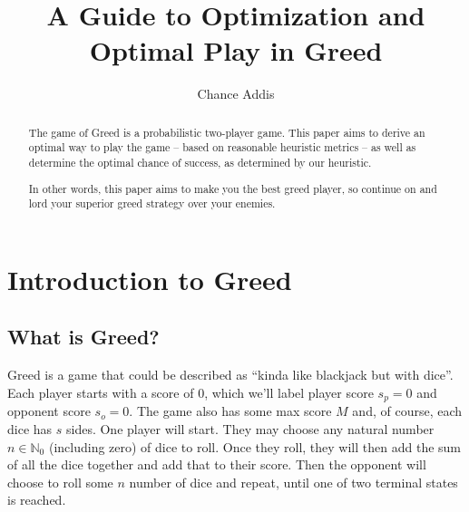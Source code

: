 \documentclass[a4paper]{article}
\title{A Guide to Optimization and Optimal Play in Greed}
\author{Chance Addis}
\affil{Department of Mathematics and Statistics, Reed College}
\begin{document}
\maketitle

\begin{abstract}
The game of Greed is a probabilistic two-player game. This paper aims to derive an optimal way to play the game -- based on reasonable heuristic metrics -- as well as determine the optimal chance of success, as determined by our heuristic. 

In other words, this paper aims to make you the best greed player, so continue on and lord your superior greed strategy over your enemies. 
\end{abstract}




\section{Introduction to Greed}


\subsection{What is Greed?}

Greed is a game that could be described as ``kinda like blackjack but with dice''. Each player starts with a score of 0, which we'll label player score $s_p = 0$ and opponent score $s_o = 0$. The game also has some max score $M$ and, of course, each dice has $s$ sides. One player will start. They may choose any natural number $n \in \mathbb{N}_0$ (including zero) of dice to roll. Once they roll, they will then add the sum of all the dice together and add that to their score. Then the opponent will choose to roll some $n$ number of dice and repeat, until one of two terminal states is reached.
\end{document}
